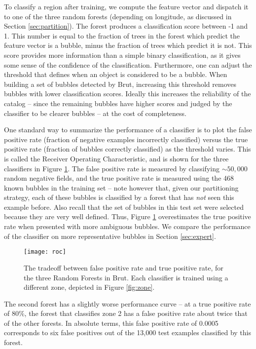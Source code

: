 \documentclass[preprint]{aastex}
\begin{document}
To classify a region after training, we compute the feature vector and dispatch it to one of the three random forests (depending on longitude, as discussed in Section \ref{sec:partition}). The forest produces a classification score between -1 and 1. This number is equal to the fraction of trees in the forest which predict the feature vector is a bubble, minus the fraction of trees which predict it is not. This score provides more information than a simple binary classification, as it gives some sense of the confidence of the classification. Furthermore, one can adjust the threshold that defines when an object is considered to be a bubble. When building a set of bubbles detected by Brut, increasing this threshold removes bubbles with lower classification scores. Ideally this increases the reliability of the catalog -- since the remaining bubbles have higher scores and judged by the classifier to be clearer bubbles -- at the cost of completeness. 

One standard way to summarize the performance of a classifier is to plot the false positive rate (fraction of negative examples incorrectly classified) versus the true positive rate (fraction of bubbles correctly classified) as the threshold varies. This is called the Receiver Operating Characteristic, and is shown for the three classifiers in Figure \ref{fig:roc}. The false positive rate is measured by classifying $\sim 50,000$ random negative fields, and the true positive rate is measured using the 468 known bubbles in the training set -- note however that, given our partitioning strategy, each of these bubbles is classified by a forest that has \textit{not} seen this example before. Also recall that the set of bubbles in this test set were selected because they are very well defined. Thus, Figure \ref{fig:roc} overestimates the true positive rate when presented with more ambiguous bubbles. We compare the performance of the classifier on more representative bubbles in Section \ref{sec:expert}.

\begin{figure}[h!]
\texttt{[image: roc]}
\caption{The tradeoff between false positive rate and true positive rate, for the three Random Forests in Brut. Each classifier is trained using a different zone, depicted in Figure \ref{fig:zone}.}
\label{fig:roc}
\end{figure}

The second forest has a slightly worse performance curve -- at a true positive rate of 80\%, the forest that classifies zone 2 has a false positive rate about twice that of the other forests. In absolute terms, this false positive rate of 0.0005 corresponds to six false positives out of the 13,000 test examples classified by this forest. 
\end{document}
